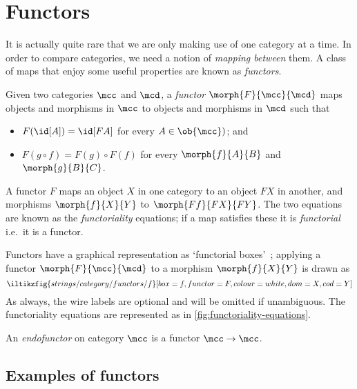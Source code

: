 \section{Functors}\label{sec:functors}

It is actually quite rare that we are only making use of one category at a time.
In order to compare categories, we need a notion of \emph{mapping between} them.
A class of maps that enjoy some useful properties are known as \emph{functors}.

\begin{definition}[Functor]
    Given two categories \(\mcc\) and \(\mcd\), a \emph{functor} \(
    \morph{F}{\mcc}{\mcd}
    \) maps objects and morphisms in \(\mcc\) to objects and morphisms in
    \(\mcd\) such that
    \begin{itemize}
        \item \(F(\id[A]) = \id[FA]\) for every \(A \in \ob{\mcc})\); and
        \item \(F(g \circ f) = F(g) \circ F(f)\) for every \(\morph{f}{A}{B}\)
              and \(\morph{g}{B}{C}\).
    \end{itemize}
\end{definition}

A functor \(F\) maps an object \(X\) in one category to an object \(FX\) in
another, and morphisms \(\morph{f}{X}{Y}\) to \(\morph{Ff}{FX}{FY}\).
The two equations are known as the \emph{functoriality} equations; if a map
satisfies these it is \emph{functorial} i.e.\ it is a functor.

Functors have a graphical representation as `functorial
boxes'~\cite{mellies2006functorial}; applying a functor \(\morph{F}{\mcc}{\mcd}\)
to a morphism \(\morph{f}{X}{Y}\) is drawn as
\[
    \iltikzfig{strings/category/functors/f}[box=f,functor=F,colour=white,dom=X,cod=Y]
\]
As always, the wire labels are optional and will be omitted if unambiguous.
The functoriality equations are represented as in
\cref{fig:functoriality-equations}.



\begin{definition}[Endofunctor]
    An \emph{endofunctor} on category \(\mcc\) is a functor \(\mcc \to \mcc\).
\end{definition}

\subsection{Examples of functors}

